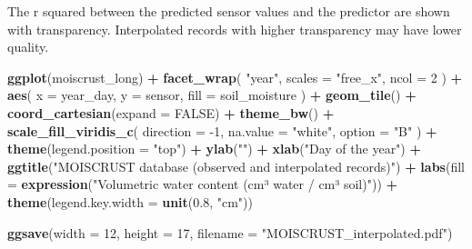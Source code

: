 \documentclass[]{article}
\newenvironment{Shaded}{\begin{snugshade}}{\end{snugshade}}
\newcommand{\DataTypeTok}[1]{\textcolor[rgb]{0.13,0.29,0.53}{#1}}
\newcommand{\DecValTok}[1]{\textcolor[rgb]{0.00,0.00,0.81}{#1}}
\newcommand{\FloatTok}[1]{\textcolor[rgb]{0.00,0.00,0.81}{#1}}
\newcommand{\KeywordTok}[1]{\textcolor[rgb]{0.13,0.29,0.53}{\textbf{#1}}}
\newcommand{\NormalTok}[1]{#1}
\newcommand{\OperatorTok}[1]{\textcolor[rgb]{0.81,0.36,0.00}{\textbf{#1}}}
\newcommand{\OtherTok}[1]{\textcolor[rgb]{0.56,0.35,0.01}{#1}}
\newcommand{\StringTok}[1]{\textcolor[rgb]{0.31,0.60,0.02}{#1}}
\begin{document}
The r squared between the predicted sensor values and the predictor are
shown with transparency. Interpolated records with higher transparency
may have lower quality.

\begin{Shaded}
\begin{Highlighting}[]
\KeywordTok{ggplot}\NormalTok{(moiscrust_long) }\OperatorTok{+}\StringTok{ }
\StringTok{  }\KeywordTok{facet_wrap}\NormalTok{(}
    \StringTok{"year"}\NormalTok{, }
    \DataTypeTok{scales =} \StringTok{"free_x"}\NormalTok{, }
    \DataTypeTok{ncol =} \DecValTok{2}
\NormalTok{    ) }\OperatorTok{+}
\StringTok{  }\KeywordTok{aes}\NormalTok{(}
    \DataTypeTok{x =}\NormalTok{ year_day, }
    \DataTypeTok{y =}\NormalTok{ sensor, }
    \DataTypeTok{fill =}\NormalTok{ soil_moisture}
\NormalTok{    ) }\OperatorTok{+}\StringTok{ }
\StringTok{  }\KeywordTok{geom_tile}\NormalTok{() }\OperatorTok{+}\StringTok{ }
\StringTok{  }\KeywordTok{coord_cartesian}\NormalTok{(}\DataTypeTok{expand =} \OtherTok{FALSE}\NormalTok{) }\OperatorTok{+}
\StringTok{  }\KeywordTok{theme_bw}\NormalTok{() }\OperatorTok{+}\StringTok{ }
\StringTok{  }\KeywordTok{scale_fill_viridis_c}\NormalTok{(}
    \DataTypeTok{direction =} \DecValTok{-1}\NormalTok{, }
    \DataTypeTok{na.value =} \StringTok{"white"}\NormalTok{, }
    \DataTypeTok{option =} \StringTok{"B"}
\NormalTok{    ) }\OperatorTok{+}
\StringTok{  }\KeywordTok{theme}\NormalTok{(}\DataTypeTok{legend.position =} \StringTok{"top"}\NormalTok{) }\OperatorTok{+}\StringTok{ }
\StringTok{  }\KeywordTok{ylab}\NormalTok{(}\StringTok{""}\NormalTok{) }\OperatorTok{+}\StringTok{ }
\StringTok{  }\KeywordTok{xlab}\NormalTok{(}\StringTok{"Day of the year"}\NormalTok{) }\OperatorTok{+}
\StringTok{  }\KeywordTok{ggtitle}\NormalTok{(}\StringTok{"MOISCRUST database (observed and interpolated records)"}\NormalTok{) }\OperatorTok{+}
\StringTok{  }\KeywordTok{labs}\NormalTok{(}\DataTypeTok{fill =} \KeywordTok{expression}\NormalTok{(}\StringTok{"Volumetric water content (cm³ water / cm³ soil)"}\NormalTok{)) }\OperatorTok{+}\StringTok{ }
\StringTok{  }\KeywordTok{theme}\NormalTok{(}\DataTypeTok{legend.key.width =} \KeywordTok{unit}\NormalTok{(}\FloatTok{0.8}\NormalTok{, }\StringTok{"cm"}\NormalTok{))}

\KeywordTok{ggsave}\NormalTok{(}\DataTypeTok{width =} \DecValTok{12}\NormalTok{, }\DataTypeTok{height =} \DecValTok{17}\NormalTok{, }\DataTypeTok{filename =} \StringTok{"MOISCRUST_interpolated.pdf"}\NormalTok{)}
\end{Highlighting}
\end{Shaded}
\end{document}
